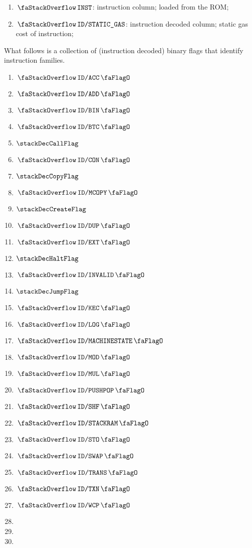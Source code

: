 \begin{enumerate}[resume]
	\item $\stackInst$:
		instruction column; loaded from the ROM;
	\item $\stackStaticGas$:
		instruction decoded column;
		static gas cost of instruction;
\end{enumerate}
What follows is a collection of (instruction decoded) binary flags that identify instruction families.
\begin{multicols}{4}
	\begin{enumerate}[resume]
		\item $\stackDecAccFlag$
		\item $\stackDecAddFlag$
		\item $\stackDecBinFlag$
		\item $\stackDecBtcFlag$
		\item $\stackDecCallFlag$
		\item $\stackDecConFlag$
		\item $\stackDecCopyFlag$
		\item $\stackDecMcopyFlag$
		\item $\stackDecCreateFlag$
		\item $\stackDecDupFlag$
		\item $\stackDecExtFlag$
		\item $\stackDecHaltFlag$
		\item $\stackDecInvalidFlag$
		\item $\stackDecJumpFlag$
		\item $\stackDecKecFlag$
		\item $\stackDecLogFlag$
		\item $\stackDecMachineStateFlag$
		\item $\stackDecModFlag$
		\item $\stackDecMulFlag$
		\item $\stackDecPushPopFlag$
		\item $\stackDecShfFlag$
		\item $\stackDecStackRamFlag$
		\item $\stackDecStoFlag$
		\item $\stackDecSwapFlag$
		\item $\stackDecTransFlag$
		\item $\stackDecTxnFlag$
		\item $\stackDecWcpFlag$
		\item[\vspace{\fill}]
		\item[\vspace{\fill}]
		\item[\vspace{\fill}]
	\end{enumerate}
\end{multicols}
